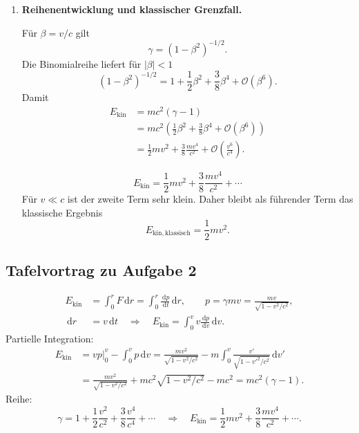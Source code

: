 \documentclass[11pt,a4paper]{scrartcl}
\newcommand{\abs}[1]{\left| #1 \right|}
\newcommand{\paren}[1]{\left( #1 \right)}
\newcommand{\dd}{\,\mathrm{d}}
\newcommand{\dv}[2]{\frac{\dd #1}{\dd #2}}
\newcommand{\evalat}[2]{\left. #1 \right|_{#2}}
\theoremstyle{definition}
\theoremstyle{plain}
\theoremstyle{remark}
\begin{document}
\begin{enumerate}[label=(\alph*)]
    \begin{answerbox}
    \[
        \boxed{E_{\mathrm{kin}} = mc^2(\gamma-1)
        = mc^2\paren{\frac{1}{\sqrt{1-v^2/c^2}}-1}}.
    \]
    \end{answerbox}

    \item \textbf{Reihenentwicklung und klassischer Grenzfall.}

    \begin{calculationbox}
    Für $\beta=v/c$ gilt
    \[
        \gamma = (1-\beta^2)^{-1/2}.
    \]
    Die Binomialreihe liefert für $\abs{\beta}<1$
    \[
        (1-\beta^2)^{-1/2}
        = 1+\frac{1}{2}\beta^2+\frac{3}{8}\beta^4+\mathcal{O}(\beta^6).
    \]
    Damit
    \begin{align*}
        E_{\mathrm{kin}}
        &= mc^2(\gamma-1)\\
        &= mc^2\paren{\frac{1}{2}\beta^2+\frac{3}{8}\beta^4+\mathcal{O}(\beta^6)}\\
        &= \frac{1}{2}mv^2+\frac{3}{8}\frac{mv^4}{c^2}+\mathcal{O}\paren{\frac{v^6}{c^4}}.
    \end{align*}
    \end{calculationbox}

    \begin{answerbox}
    \[
        \boxed{E_{\mathrm{kin}}
        =\frac{1}{2}mv^2+\frac{3}{8}\frac{mv^4}{c^2}+\cdots}
    \]
    Für $v\ll c$ ist der zweite Term sehr klein. Daher bleibt als führender Term das klassische Ergebnis
    \[
        \boxed{E_{\mathrm{kin,klassisch}}=\frac{1}{2}mv^2}.
    \]
    \end{answerbox}
\end{enumerate}

\subsection{Tafelvortrag zu Aufgabe 2}
\begin{talkbox}
\begin{align*}
    E_{\mathrm{kin} }
    &=\int_0^r F\dd r
      =\int_0^r \dv{p}{t}\dd r,
      \qquad
      p=\gamma mv=\frac{mv}{\sqrt{1-v^2/c^2}},\\
    \dd r&=v\dd t
    \quad\Rightarrow\quad
    E_{\mathrm{kin}}=\int_0^v v\dv{p}{v}\dd v.
\end{align*}
Partielle Integration:
\begin{align*}
    E_{\mathrm{kin} }
    &= \evalat{vp}{0}^{v}-\int_0^v p\dd v
     = \frac{mv^2}{\sqrt{1-v^2/c^2}}
       -m\int_0^v\frac{v'}{\sqrt{1-v'^2/c^2}}\dd v'\\
    &= \frac{mv^2}{\sqrt{1-v^2/c^2}}
       +mc^2\sqrt{1-v^2/c^2}-mc^2
     = mc^2(\gamma-1).
\end{align*}
Reihe:
\[
    \gamma=1+\frac12\frac{v^2}{c^2}+\frac38\frac{v^4}{c^4}+\cdots
    \quad\Rightarrow\quad
    E_{\mathrm{kin}}=\frac12mv^2+\frac38\frac{mv^4}{c^2}+\cdots.
\]
\end{talkbox}
\end{document}
